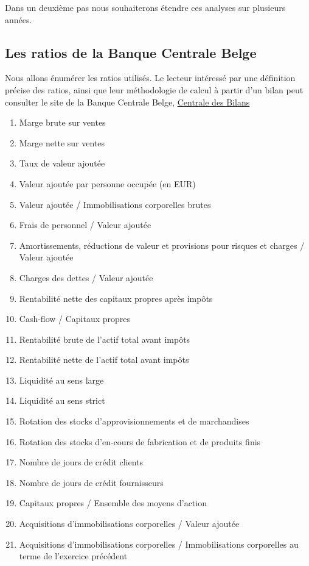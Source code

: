 \documentclass[DIV=calc, paper=a4, fontsize=11pt, twocolumn]{scrartcl}
\begin{document}
Dans un deuxième pas nous souhaiterons étendre ces analyses sur plusieurs années.
\begin{appendices}
\section{Les ratios de la Banque Centrale Belge}
Nous allons énumérer les ratios utilisés. Le lecteur intéressé par une définition précise des ratios, ainsi que leur méthodologie de calcul à partir d'un bilan peut consulter le site de la Banque Centrale Belge, \href{https://www.nbb.be/fr/centrale-des-bilans}{Centrale des Bilans}
\begin{enumerate}
\item Marge brute sur ventes
\item Marge nette sur ventes
\item Taux de valeur ajoutée
\item Valeur ajoutée par personne occupée (en EUR)
\item Valeur ajoutée / Immobilisations corporelles brutes
\item Frais de personnel / Valeur ajoutée
\item Amortissements, réductions de valeur et provisions pour risques et charges / Valeur ajoutée 
\item Charges des dettes / Valeur ajoutée 
\item Rentabilité nette des capitaux propres après impôts
\item Cash-flow / Capitaux propres
\item Rentabilité brute de l’actif total avant impôts
\item Rentabilité nette de l’actif total avant impôts
\item Liquidité au sens large
\item Liquidité au sens strict
\item Rotation des stocks d'approvisionnements et de marchandises
\item Rotation des stocks d'en-cours de fabrication et de produits finis
\item Nombre de jours de crédit clients
\item Nombre de jours de crédit fournisseurs
\item Capitaux propres / Ensemble des moyens d’action
\item Acquisitions d'immobilisations corporelles / Valeur ajoutée
\item Acquisitions d'immobilisations corporelles / Immobilisations corporelles au terme de l'exercice précédent
\end{enumerate}


\end{appendices}
\end{document}
